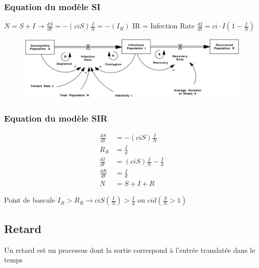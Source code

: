 \documentclass[resume]{subfiles}
\begin{document}
\subsubsection{Equation du modèle SI}

$N=S+I \rightarrow \frac{dS}{dt}=-(ciS)\frac{I}{N}= -(I_R)$ IR = Infection Rate $\frac{dI}{dt}=ci\cdot I(1-\frac{I}{N})$ 

\begin{figure}[H]
    \centering
    \includegraphics[width=1\columnwidth]{Figures/SIR_1.png}
\end{figure}

\subsubsection{Equation du modèle SIR}

\begin{align*}
\frac{dS}{dt}&=-(ciS)\frac{I}{N}\\
R_R&=\frac{I}{d}\\
\frac{dI}{dt} &= (ciS)\frac{I}{N}-\frac{I}{d}\\
\frac{dR}{dt} &= \frac{I}{d}\\
N&=S+I+R
\end{align*}


Point de bascule $I_R > R_R \rightarrow ciS(\frac{I}{N}) > \frac{I}{d}$ ou $cid(\frac{S}{N} > 1)$ 

\subsection{Retard}

Un retard est un processus dont la sortie correspond à l’entrée translatée dans le temps
\end{document}
